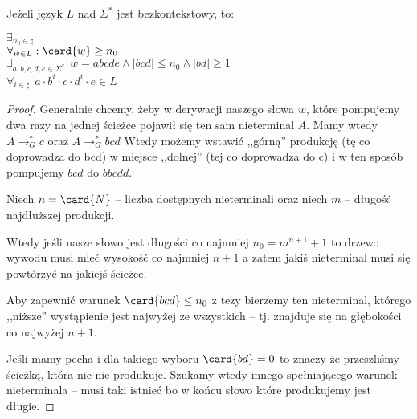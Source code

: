 \begin{theorem}
	Jeżeli język \(L\) nad \(\Sigma^*\) jest bezkontekstowy, to:

	\( \exists_{n_0 \in \natural} \) \\
	\( \forall_{w \in L} : \card{w} \geq n_0 \) \\
	\( \exists_{a, b, c, d, e \in \Sigma^*} \hspace{5pt} w = abcde \land |bcd| \leq n_0 \land |bd| \geq 1 \) \\
	\( \forall_{i \in \natural} \hspace{5pt} a \cdot b^{i} \cdot c \cdot d^{i} \cdot e \in L\)
\end{theorem}
\begin{proof}
	Generalnie chcemy, żeby w derywacji naszego słowa \( w \), które pompujemy dwa razy na jednej ścieżce pojawił się ten sam nieterminal \( A \). Mamy wtedy \( A \rightarrow_G^* c\) oraz \( A \rightarrow_G^* bcd \) Wtedy możemy wstawić ,,górną'' produkcję (tę co doprowadza do bcd) w miejsce ,,dolnej'' (tej co doprowadza do c) i w ten sposób pompujemy \( bcd \) do  \( bbcdd \).

	Niech \( n = \card{N} \) -- liczba dostępnych nieterminali oraz niech \( m \) -- długość najdłuższej produkcji.

	Wtedy jeśli nasze słowo jest długości co najmniej \( n_0 = m^{n + 1} + 1 \) to drzewo wywodu musi mieć wysokość co najmniej \( n + 1 \) a zatem jakiś nieterminal musi się powtórzyć na jakiejś ścieżce.

	Aby zapewnić warunek \( \card{bcd} \leq n_0 \) z tezy bierzemy ten nieterminal, którego ,,niższe'' wystąpienie jest najwyżej ze wszystkich -- tj. znajduje się na głębokości co najwyżej \( n + 1 \).

	Jeśli mamy pecha i dla takiego wyboru \( \card{bd} = 0 \) to znaczy że przeszliśmy ścieżką, która nic nie produkuje.
	Szukamy wtedy innego spełniającego warunek nieterminala -- musi taki istnieć bo w końcu słowo które produkujemy jest długie.

\end{proof}
